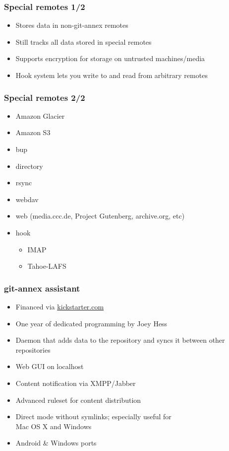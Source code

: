 \documentclass[t]{beamer}
\begin{document}
\begin{frame}
	\frametitle{Special remotes 1/2}
	\begin{itemize}
		\item Stores data in non-git-annex remotes
		\item Still tracks all data stored in special remotes
		\item Supports encryption for storage on untrusted machines/media
		\item Hook system lets you write to and read from arbitrary remotes
	\end{itemize}
\end{frame}

\begin{frame}
	\frametitle{Special remotes 2/2}
	\begin{itemize}
		\item Amazon Glacier
		\item Amazon S3
		\item bup
		\item directory
		\item rsync
		\item webdav
		\item web (media.ccc.de, Project Gutenberg, archive.org, etc)
		\item hook
		\begin{itemize}
			\item IMAP
			\item Tahoe-LAFS
		\end{itemize}
	\end{itemize}
\end{frame}

\begin{frame}
	\frametitle{git-annex assistant}
	\begin{itemize}
		\item Financed via \url{kickstarter.com}
		\item One year of dedicated programming by Joey Hess
		\item Daemon that adds data to the repository and syncs it between other repositories
		\item Web GUI on localhost
		\item Content notification via XMPP/Jabber
		\item Advanced ruleset for content distribution
		\item Direct mode without symlinks; especially useful for \\
			Mac OS X and Windows
		\item Android \& Windows ports
	\end{itemize}
\end{frame}
\end{document}
